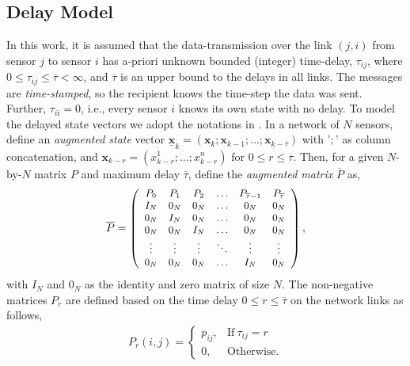 \documentclass[journal]{IEEEtran}
\def\mb{\mathbf}
\begin{document}
\subsection{Delay Model} \label{sec_delay}
In this work, it is assumed that the data-transmission over the link $(j,i)$ from sensor $j$ to sensor $i$  has a-priori unknown bounded (integer)  time-delay, $\tau_{ij}$, where $0\leq \tau_{ij} \leq \overline{\tau} <\infty$, and $\overline{\tau}$ is an upper bound to the delays in all links. The messages are \textit{time-stamped}, so the recipient knows the time-step the data was sent.
Further, $\tau_{ii}=0$, i.e., every sensor $i$ knows its own state with no delay. To model the delayed state vectors we adopt the notations in \cite{Themis_delay}. In a network of $N$ sensors, define an \textit{augmented state} vector $\underline{\mb{x}}_k = \left(\mb{x}_k; \mb{x}_{k-1}; \dots; \mb{x}_{k-\overline{\tau}} \right)$  with '$;$' as column concatenation, and $\mb{x}_{k-r} = \left({x}^1_{k-r};  \dots; {x}^n_{k-r} \right)$ for $0\leq r \leq \overline{\tau}$. Then, for a given $N$-by-$N$ matrix $P$ and maximum delay $\overline{\tau}$, define the \textit{augmented matrix} $\overline{P}$ as,
 \begin{align} \label{eq_aug_W} \small
	\overline{P}= \left( 
	\begin{array}{cccccc}
		P_0 & P_1 & P_{2} & \hdots & P_{\overline{\tau}-1} & P_{\overline{\tau}} \\
		I_N &   0_N & 0_N &\hdots  & 0_N& 0_N\\
		0_N & I_N & 0_N &  \hdots  & 0_N & 0_N  \\
		0_N &  0_N & I_N  &  \hdots  & 0_N & 0_N  \\
		\vdots & \vdots & \vdots & \ddots & \vdots & \vdots \\
		0_N & 0_N & 0_N & \hdots & I_N & 0_N
	\end{array}	
	\right), \normalsize
\end{align} 
with $I_{N}$ and $0_{N}$ as the identity and zero matrix of size $N$. The non-negative matrices $P_r$ are defined based on the time delay $0\leq r \leq \overline{\tau} $ on the network links as follows,
\begin{align}
	P_r(i,j) = \left\{
	\begin{array}{ll}
		p_{ij}, & \text{If}~ \tau_{ij}=r  \\
		0, & \text{Otherwise}.
	\end{array}\right.
\end{align}
\end{document}
